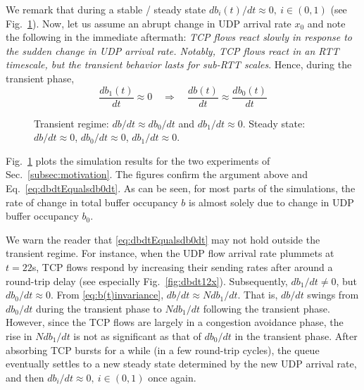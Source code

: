 \documentclass{IEEEtran}
\begin{document}
    We remark  that during a stable / steady state  $db_i(t)/dt\approx 0,~i\in(0,1)$ (see Fig.~\ref{fig:dbdt}). 
    Now, let us assume  an abrupt change in UDP arrival rate $x_0$ and note the following in the immediate aftermath:
\textit{ TCP flows react slowly in response to the sudden change in UDP arrival rate. Notably, TCP flows react in an RTT timescale, but the transient behavior lasts for sub-RTT scales}.
    Hence, during the transient phase,
    \begin{equation}\label{eq:dbdtEqualsdb0dt}
        \frac{db_1(t)}{dt} \approx 0 \quad \Rightarrow \quad \frac{db(t)}{dt} \approx \frac{db_0(t)}{dt}
    \end{equation}

    \begin{figure}[bht!]\centering
                  \hspace{5mm}
            \caption{Transient regime: $db/dt \approx db_0/dt$ and $db_1/dt \approx 0$. Steady state: $db/dt\approx 0 $, $db_0/dt\approx 0 $, $db_1/dt\approx 0 $.}
            \label{fig:dbdt}
    \end{figure}

    Fig.~\ref{fig:dbdt} plots the simulation results for the two experiments of Sec.~\ref{subsec:motivation}. The figures confirm the argument above and Eq.~\eqref{eq:dbdtEqualsdb0dt}. As can be seen, for most parts of the simulations, the rate of change in total buffer occupancy $b$ is almost solely due to change in UDP buffer occupancy $b_0$.

    We warn the reader that \eqref{eq:dbdtEqualsdb0dt} may not hold outside the transient regime. For instance, when the UDP flow arrival rate plummets at $t=22$s, TCP flows respond by increasing their sending rates after around a round-trip delay (see especially Fig.~\ref{fig:dbdt12x}). Subsequently, $db_1/dt \neq 0$, but $db_0/dt\approx 0$. From \eqref{eq:b(t)invariance}, $db/dt\approx N db_1/dt$. That is, $db/dt$ swings from $db_0/dt$ during the transient phase to $Ndb_1/dt$ following the transient phase. However, since the TCP flows are largely in a congestion avoidance phase, the rise in $Ndb_1/dt$ is not as significant as that of $db_0/dt$ in the transient phase. After absorbing TCP bursts for a while (in a few round-trip cycles), the queue eventually settles to a new steady state determined by the new UDP arrival rate, and then $db_i/dt \approx 0,~i\in(0,1) $ once again.
\end{document}
